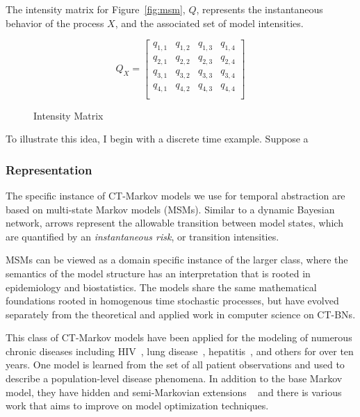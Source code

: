 The intensity matrix for Figure~\ref{fig:msm}, $Q$, represents the instantaneous behavior of the process $X$, and the associated set of model intensities.
\begin{figure}[h!]
\begin{center}
\[
Q_X =
  \begin{bmatrix}
    q_{1,1} & q_{1,2} & q_{1,3} & q_{1,4}\\
    q_{2,1} & q_{2,2} & q_{2,3} & q_{2,4}\\
    q_{3,1} & q_{3,2} & q_{3,3} & q_{3,4}\\
    q_{4,1} & q_{4,2} & q_{4,3} & q_{4,4}\\
  \end{bmatrix}
\]
\end{center}
\caption{Intensity Matrix}
\label{fig:q}
\end{figure}


To illustrate this idea, I begin with a discrete time example.  Suppose a 

\subsubsection{Representation}
The specific instance of CT-Markov models we use for temporal abstraction are based on multi-state Markov models (MSMs).  Similar to a dynamic Bayesian network, arrows represent the allowable transition between model states, which are quantified by an \emph{instantaneous risk}, or transition intensities.

MSMs can be viewed as a domain specific instance of the larger class, where the semantics of the model structure has an interpretation that is rooted in epidemiology and biostatistics.  The models share the same mathematical foundations rooted in homogenous time stochastic processes, but have evolved separately from the theoretical and applied work in computer science on CT-BNs.

This class of CT-Markov models have been applied for the modeling of numerous chronic diseases including HIV~\cite{Presanis11}, lung disease~\cite{Titman10}, hepatitis~\cite{Sweeting10}, and others for over ten years.  One model is learned from the set of all patient observations and used to describe a population-level disease phenomena.  In addition to the base Markov model, they have hidden and semi-Markovian extensions ~\cite{Jackson2011} and there is various work that aims to improve on model optimization techniques.




